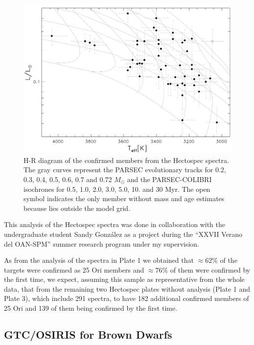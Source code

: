 \documentclass[12pt]{article}
\begin{document}
\begin{figure}[ht!]
	\includegraphics[width=1.0\textwidth]{HR_Hectospec.pdf}
	\caption[H-R diagram of the so far confirmed members from the Hectospec spectra.]{H-R diagram of the confirmed members from the Hectospec spectra. The gray curves represent the PARSEC evolutionary tracks for 0.2, 0.3, 0.4, 0.5, 0.6, 0.7 and 0.72 $M_\odot$ and the PARSEC-COLIBRI isochrones for 0.5, 1.0, 2.0, 3.0, 5.0, 10. and 30 Myr. The open symbol indicates the only member without mass and age estimates because lies outside the model grid.}
	\label{fig_Hectospec:HR}
\end{figure}

This analysis of the Hectospec spectra was done in collaboration with the undergraduate student Sandy Gonz\'alez as a project during the ``XXVII Verano del OAN-SPM'' summer research program under my supervision.

As from the analysis of the spectra in Plate 1 we obtained that $\approx62\%$ of the targets were confirmed as 25 Ori members and $\approx76\%$ of them were confirmed by the first time, we expect, assuming this sample as representative from the whole data, that from the remaining two Hectospec plates without analysis (Plate 1 and Plate 3), which include 291 spectra, to have 182 additional confirmed members of 25 Ori and 139 of them being confirmed by the first time.

\subsection{GTC/OSIRIS for Brown Dwarfs}
\label{sec:OSIRIS}
\end{document}
